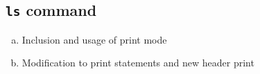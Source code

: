 \documentclass[11pt,letterpaper]{report}
\begin{document}
                                                                                                                                                                                                                                                                                                                                                                                                                                                                          \subsection*{{\tt ls} command}
                                                                                                                                                                                                                                                                                                                                                                                                                                                                            \begin{enumerate}[(a)]
                                                                                                                                                                                                                                                                                                                                                                                                                                                                                  \item Inclusion and usage of print mode
                                                                                                                                                                                                                                                                                                                                                                                                                                                                                        \item Modification to print statements and new header print
                                                                                                                                                                                                                                                                                                                                                                                                                                                                                          \end{enumerate}
                                                                                                                                                                                                                                                                                                                                                                                                                                                                                            
\end{document}
